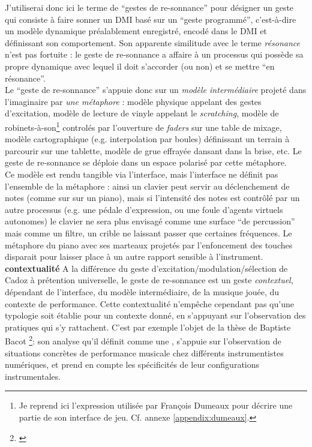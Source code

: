 \noindent J'utiliserai donc ici le terme de ``gestes de re-sonnance'' pour désigner un geste qui consiste à faire sonner un \gls{DMI} basé sur un ``geste programmé'', c'est-à-dire un modèle dynamique préalablement enregistré, encodé dans le \gls{DMI} et définissant son comportement. Son apparente similitude avec le terme \textit{résonance} n'est pas fortuite : le geste de re-sonnance a affaire à un processus qui possède sa propre dynamique avec lequel il doit s'accorder (ou non) et se mettre ``en résonance''.\\
\indent Le ``geste de re-sonnance'' s'appuie donc sur un \textit{modèle intermédiaire} projeté dans l'imaginaire par \textit{une métaphore} : modèle physique appelant des gestes d'excitation, modèle de lecture de vinyle appelant le \textit{scratching}, modèle de robinets-à-son\footnote{Je reprend ici l'expression utilisée par François Dumeaux pour décrire une partie de son interface de jeu. Cf. annexe \ref{appendix:dumeaux}.} controlés par l'ouverture de \textit{faders} sur une table de mixage, modèle cartographique (e.g. interpolation par boules) définissant un terrain à parcourir sur une tablette, modèle de grue effrayée dansant dans la brise, etc. Le geste de re-sonnance se déploie dans un espace polarisé par cette métaphore.\\
\indent Ce modèle est rendu tangible via l'interface, mais l'interface ne définit pas l'ensemble de la métaphore : ainsi un clavier peut servir au déclenchement de notes (comme sur sur un piano), mais si l'intensité des notes est contrôlé par un autre processus (e.g. une pédale d'expression, ou une foule d'agents virtuels autonomes) le clavier ne sera plus envisagé comme une surface ``de percussion'' mais comme un filtre, un crible ne laissant passer que certaines fréquences. Le métaphore du piano avec ses marteaux projetés par l'enfoncement des touches disparait pour laisser place à un autre rapport sensible à l'instrument.\\
\noindent \textbf{contextualité} A la différence du geste d'excitation/modulation/sélection de Cadoz à prétention universelle, le geste de re-sonnance est un geste \textit{contextuel}, dépendant de l'interface, du modèle intermédiaire, de la musique jouée, du contexte de performance. Cette contextualité n'empêche cependant pas qu'une typologie soit établie pour un contexte donné, en s'appuyant sur l'observation des pratiques qui s'y rattachent. C'est par exemple l'objet de la thèse de Baptiste Bacot \footnote{\cite{bacot_geste_2017}}: son analyse qu'il définit comme une , s'appuie sur l'observation de situations concrètes de performance musicale chez différents instrumentistes numériques, et prend en compte les spécificités de leur configurations instrumentales.\\

